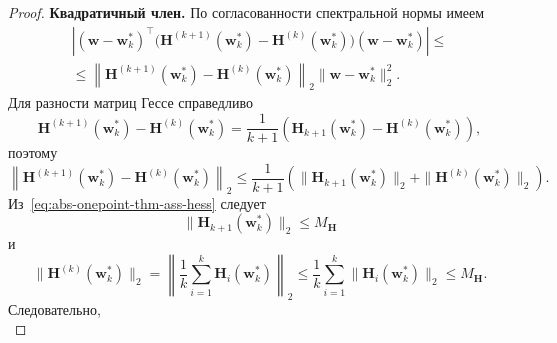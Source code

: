 \begin{proof}
    \textbf{Квадратичный член.}
    По согласованности спектральной нормы имеем
    \begin{multline}
        \label{eq:abs-onepoint-general-proof-step9}
        \left|
            (\mathbf w-\mathbf w_k^*)^\top
            \Big(
                \mathbf H^{(k+1)}(\mathbf w_k^*)
                -
                \mathbf H^{(k)}(\mathbf w_k^*)
            \Big)
            (\mathbf w-\mathbf w_k^*)
        \right|
        \leqslant
        \\
        \leqslant
        \left\|
            \mathbf H^{(k+1)}(\mathbf w_k^*)
            -
            \mathbf H^{(k)}(\mathbf w_k^*)
        \right\|_2
        \|\mathbf w-\mathbf w_k^*\|_2^2.
    \end{multline}
    Для разности матриц Гессе справедливо
    \begin{equation}
        \label{eq:abs-onepoint-general-proof-step10}
        \mathbf H^{(k+1)}(\mathbf w_k^*)
        -
        \mathbf H^{(k)}(\mathbf w_k^*)
        =
        \frac{1}{k+1}
        \left(
            \mathbf H_{k+1}(\mathbf w_k^*)
            -
            \mathbf H^{(k)}(\mathbf w_k^*)
        \right),
    \end{equation}
    поэтому
    \begin{equation}
        \label{eq:abs-onepoint-general-proof-step11}
        \left\|
            \mathbf H^{(k+1)}(\mathbf w_k^*)
            -
            \mathbf H^{(k)}(\mathbf w_k^*)
        \right\|_2
        \leqslant
        \frac{1}{k+1}
        \left(
            \|\mathbf H_{k+1}(\mathbf w_k^*)\|_2
            +
            \|\mathbf H^{(k)}(\mathbf w_k^*)\|_2
        \right).
    \end{equation}
    Из~\eqref{eq:abs-onepoint-thm-ass-hess} следует
    \begin{equation}
        \label{eq:abs-onepoint-general-proof-step12}
        \|\mathbf H_{k+1}(\mathbf w_k^*)\|_2
        \leqslant
        M_{\mathbf H}
    \end{equation}
    и
    \begin{equation}
        \label{eq:abs-onepoint-general-proof-step13}
        \|\mathbf H^{(k)}(\mathbf w_k^*)\|_2
        =
        \left\|
            \frac{1}{k}\sum_{i=1}^k \mathbf H_i(\mathbf w_k^*)
        \right\|_2
        \leqslant
        \frac{1}{k}\sum_{i=1}^k \|\mathbf H_i(\mathbf w_k^*)\|_2
        \leqslant
        M_{\mathbf H}.
    \end{equation}
    Следовательно,
    \begin{equation}

\end{equation}
\end{proof}
